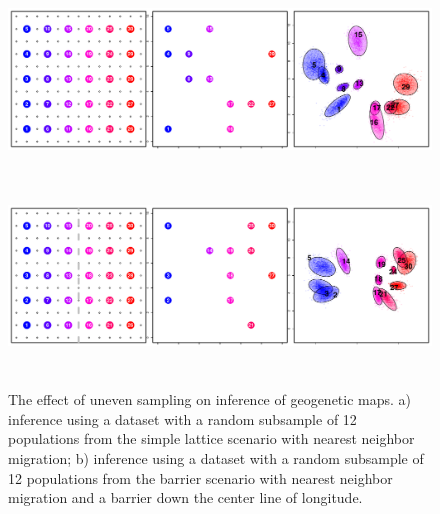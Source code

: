 \documentclass[10pt,letterpaper]{article}
\begin{document}
\begin{figure}
\centering
	\subcaptionbox{\label{lattice}}
		{\includegraphics[width=6in,height=2in]{../figs/sims/uneven_sampling_lattice.pdf}}
	\subcaptionbox{\label{barrier}}
			{\includegraphics[width=6in,height=2in]{../figs/sims/uneven_sampling_barrier.pdf}}
	\caption{The effect of uneven sampling on inference of geogenetic maps. a) inference using a dataset with a random subsample of 12 populations from the simple lattice scenario with nearest neighbor migration; b) inference using a dataset with a random subsample of 12 populations from the barrier scenario with nearest neighbor migration and a barrier down the center line of longitude.}\label{sfig:uneven_sampling}
\end{figure}
\end{document}
